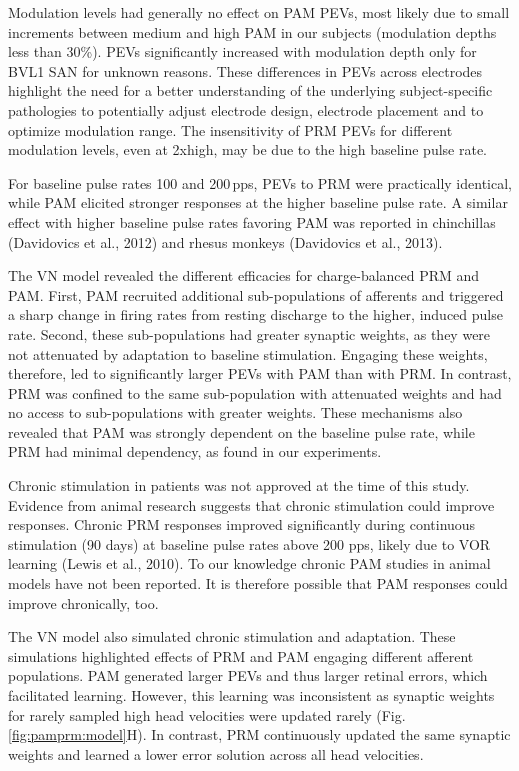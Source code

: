 	Modulation levels had generally no effect on PAM PEVs, most likely due to small increments between medium and high PAM in our subjects (modulation depths less than 30\%). PEVs significantly increased with modulation depth only for BVL1 SAN for unknown reasons. These differences in PEVs across electrodes highlight the need for a better understanding of the underlying subject-specific pathologies to potentially adjust electrode design, electrode placement and to optimize modulation range. The insensitivity of PRM PEVs for different modulation levels, even at 2xhigh, may be due to the high baseline pulse rate.
	
For baseline pulse rates 100 and 200\,pps, PEVs to PRM were practically identical, while PAM elicited stronger responses at the higher baseline pulse rate. A similar effect with higher baseline pulse rates favoring PAM was reported in chinchillas (Davidovics et al., 2012) and rhesus monkeys (Davidovics et al., 2013). 

The VN model revealed the different efficacies for charge-balanced PRM and PAM. First, PAM recruited additional sub-populations of afferents and triggered a sharp change in firing rates from resting discharge to the higher, induced pulse rate. Second, these sub-populations had greater synaptic weights, as they were not attenuated by adaptation to baseline stimulation. Engaging these weights, therefore, led to significantly larger PEVs with PAM than with PRM. In contrast, PRM was confined to the same sub-population with attenuated weights and had no access to sub-populations with greater weights. These mechanisms also revealed that PAM was strongly dependent on the baseline pulse rate, while PRM had minimal dependency, as found in our experiments. 

Chronic stimulation in patients was not approved at the time of this study. Evidence from animal research suggests that chronic stimulation could improve responses. Chronic PRM responses improved significantly during continuous stimulation (90 days) at baseline pulse rates above 200 pps, likely due to VOR learning (Lewis et al., 2010). To our knowledge chronic PAM studies in animal models have not been reported. It is therefore possible that PAM responses could improve chronically, too.

The VN model also simulated chronic stimulation and adaptation. These simulations highlighted effects of PRM and PAM engaging different afferent populations. PAM generated larger PEVs and thus larger retinal errors, which facilitated learning. However, this learning was inconsistent as synaptic weights for rarely sampled high head velocities were updated rarely (Fig.\,\ref{fig:pamprm:model}H). In contrast, PRM continuously updated the same synaptic weights and learned a lower error solution across all head velocities.

